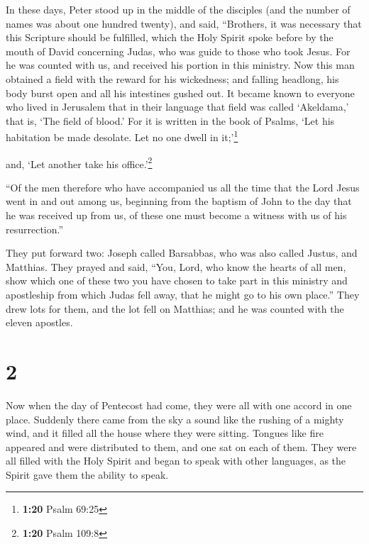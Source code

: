  In these days, Peter stood up in the middle of the
disciples (and the number of names was about one hundred twenty), and
said,  ``Brothers, it was necessary that this Scripture
should be fulfilled, which the Holy Spirit spoke before by the mouth of
David concerning Judas, who was guide to those who took Jesus.
 For he was counted with us, and received his portion in
this ministry.  Now this man obtained a field with the
reward for his wickedness; and falling headlong, his body burst open and
all his intestines gushed out.  It became known to
everyone who lived in Jerusalem that in their language that field was
called `Akeldama,' that is, `The field of blood.'  For it
is written in the book of Psalms, `Let his habitation be made desolate.
Let no one dwell in it;'\footnote{\textbf{1:20} Psalm 69:25}

and, `Let another take his office.'\footnote{\textbf{1:20} Psalm 109:8}

 ``Of the men therefore who have accompanied us all the
time that the Lord Jesus went in and out among us, 
beginning from the baptism of John to the day that he was received up
from us, of these one must become a witness with us of his
resurrection.''

 They put forward two: Joseph called Barsabbas, who was
also called Justus, and Matthias.  They prayed and said,
``You, Lord, who know the hearts of all men, show which one of these two
you have chosen  to take part in this ministry and
apostleship from which Judas fell away, that he might go to his own
place.''  They drew lots for them, and the lot fell on
Matthias; and he was counted with the eleven apostles.

\hypertarget{section-1}{%
\section{2}\label{section-1}}

 Now when the day of Pentecost had come, they were all
with one accord in one place.  Suddenly there came from
the sky a sound like the rushing of a mighty wind, and it filled all the
house where they were sitting.  Tongues like fire appeared
and were distributed to them, and one sat on each of them.
 They were all filled with the Holy Spirit and began to
speak with other languages, as the Spirit gave them the ability to
speak.

